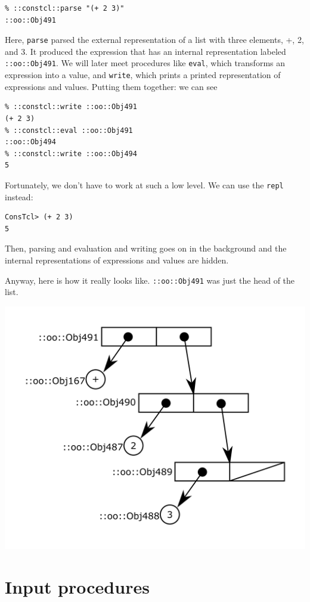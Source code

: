 \documentclass[twoside,9pt]{report}
\begin{document}
\begin{verbatim}
% ::constcl::parse "(+ 2 3)"
::oo::Obj491
\end{verbatim}


Here, \texttt{parse} parsed the external representation of a list with three elements, +, 2, and 3. It produced the expression that has an internal representation labeled \texttt{::oo::Obj491}. We will later meet procedures like \texttt{eval}, which transforms an expression into a value, and \texttt{write}, which prints a printed representation of expressions and values. Putting them together: we can see

\begin{verbatim}
% ::constcl::write ::oo::Obj491
(+ 2 3)
% ::constcl::eval ::oo::Obj491
::oo::Obj494
% ::constcl::write ::oo::Obj494
5
\end{verbatim}


Fortunately, we don't have to work at such a low level. We can use the \texttt{repl} instead:

\begin{verbatim}
ConsTcl> (+ 2 3)
5
\end{verbatim}


Then, parsing and evaluation and writing goes on in the background and the internal representations of expressions and values are hidden.


Anyway, here is how it really looks like. \texttt{::oo::Obj491} was just the head of the list.

\includegraphics{images/intreplist.png}
\section{Input procedures}
\label{input-procedures}
\end{document}
